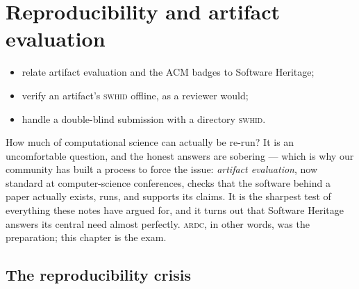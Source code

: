 \chapter{Reproducibility and artifact evaluation}
\label{ch:repro}


\begin{objectives}\small
\begin{itemize}[nosep,leftmargin=*]
  \item relate artifact evaluation and the ACM badges to Software Heritage;
  \item verify an artifact's \textsc{swhid} offline, as a reviewer would;
  \item handle a double-blind submission with a directory \textsc{swhid}.
\end{itemize}
\end{objectives}

How much of computational science can actually be re-run? It is an uncomfortable question, and the
honest answers are sobering --- which is why our community has built a process to force the issue:
\emph{artifact evaluation}, now standard at computer-science conferences, checks that the software
behind a paper actually exists, runs, and supports its claims. It is the sharpest test of
everything these notes have argued for, and it turns out that Software Heritage answers its central
need almost perfectly. \textsc{ardc}, in other words, was the preparation; this chapter is the exam.

\section{The reproducibility crisis}

